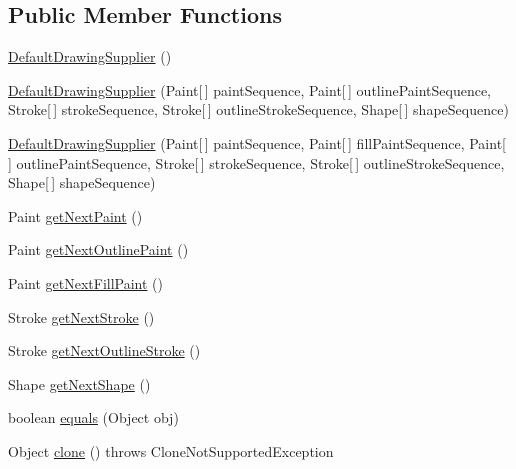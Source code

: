 \subsection*{Public Member Functions}
\begin{DoxyCompactItemize}
\item 
\mbox{\hyperlink{classorg_1_1jfree_1_1chart_1_1plot_1_1_default_drawing_supplier_a03e7a22f9a4dcdd60174538be521e18f}{Default\+Drawing\+Supplier}} ()
\item 
\mbox{\hyperlink{classorg_1_1jfree_1_1chart_1_1plot_1_1_default_drawing_supplier_a18e5b76069c71c40fbdb558601924ee3}{Default\+Drawing\+Supplier}} (Paint\mbox{[}$\,$\mbox{]} paint\+Sequence, Paint\mbox{[}$\,$\mbox{]} outline\+Paint\+Sequence, Stroke\mbox{[}$\,$\mbox{]} stroke\+Sequence, Stroke\mbox{[}$\,$\mbox{]} outline\+Stroke\+Sequence, Shape\mbox{[}$\,$\mbox{]} shape\+Sequence)
\item 
\mbox{\hyperlink{classorg_1_1jfree_1_1chart_1_1plot_1_1_default_drawing_supplier_a9b92338ce1dcc2a8fad90b48da5511b5}{Default\+Drawing\+Supplier}} (Paint\mbox{[}$\,$\mbox{]} paint\+Sequence, Paint\mbox{[}$\,$\mbox{]} fill\+Paint\+Sequence, Paint\mbox{[}$\,$\mbox{]} outline\+Paint\+Sequence, Stroke\mbox{[}$\,$\mbox{]} stroke\+Sequence, Stroke\mbox{[}$\,$\mbox{]} outline\+Stroke\+Sequence, Shape\mbox{[}$\,$\mbox{]} shape\+Sequence)
\item 
Paint \mbox{\hyperlink{classorg_1_1jfree_1_1chart_1_1plot_1_1_default_drawing_supplier_a4e1f7e6db7275fbe64dd76b6075556a9}{get\+Next\+Paint}} ()
\item 
Paint \mbox{\hyperlink{classorg_1_1jfree_1_1chart_1_1plot_1_1_default_drawing_supplier_ab6d4d685e012ec207b8aa58b926090e2}{get\+Next\+Outline\+Paint}} ()
\item 
Paint \mbox{\hyperlink{classorg_1_1jfree_1_1chart_1_1plot_1_1_default_drawing_supplier_a25a4db4213706fe8b54a0490aa14e727}{get\+Next\+Fill\+Paint}} ()
\item 
Stroke \mbox{\hyperlink{classorg_1_1jfree_1_1chart_1_1plot_1_1_default_drawing_supplier_adbe0467f0c53618cda9c1ec0d69143dd}{get\+Next\+Stroke}} ()
\item 
Stroke \mbox{\hyperlink{classorg_1_1jfree_1_1chart_1_1plot_1_1_default_drawing_supplier_a09adc92560316dcc9acabb7720a0e910}{get\+Next\+Outline\+Stroke}} ()
\item 
Shape \mbox{\hyperlink{classorg_1_1jfree_1_1chart_1_1plot_1_1_default_drawing_supplier_ada83bbc7e56d31ce1c49da7d51baf313}{get\+Next\+Shape}} ()
\item 
boolean \mbox{\hyperlink{classorg_1_1jfree_1_1chart_1_1plot_1_1_default_drawing_supplier_aae7d6a304e9b4285d429232d710614ad}{equals}} (Object obj)
\item 
Object \mbox{\hyperlink{classorg_1_1jfree_1_1chart_1_1plot_1_1_default_drawing_supplier_a5528e705efb64a994d787637446b064a}{clone}} ()  throws Clone\+Not\+Supported\+Exception 
\end{DoxyCompactItemize}
